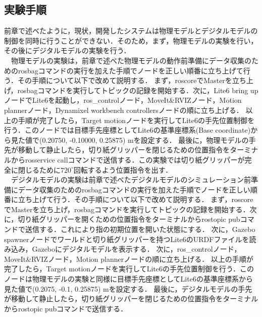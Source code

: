\subsection{実験手順}
前章で述べたように，現状，開発したシステムは物理モデルとデジタルモデルの制御を同時に行うことができない．そのため，まず，物理モデルの実験を行い，その後にデジタルモデルの実験を行う．\\
　物理モデルの実験は，前章で述べた物理モデルの動作前準備にデータ収集のためのrosbagコマンドの実行を加えた手順でノードを正しい順番に立ち上げて行う．その手順について以下で改めて説明する．
まず，roscoreでMasterを立ち上げ，rosbagコマンドを実行してトピックの記録を開始する．次に，Lite6 bring upノードでLite6を起動し，ros\_controlノード，MoveIt\&RVIZノード，Motion plannerノード，Dynamixel workbench controllersノードの順に立ち上げる．
以上の手順が完了したら，Target motionノードを実行してLite6の手先位置制御を行う．このノードでは目標手先座標としてLite6の基準座標系(Base coordinate)から見た値で(0.20750, -0.10000, 0.25875) mを設定する．
最後に，物理モデルの手先が移動して静止したら，切り紙グリッパーを閉じるための位置指令をターミナルからrosservice callコマンドで送信する．この実験では切り紙グリッパーが完全に閉じるために$720^\circ$回転するよう位置指令を出す．\\
　デジタルモデルの実験は前章で述べたデジタルモデルのシミュレーション前準備にデータ収集のためのrosbagコマンドの実行を加えた手順でノードを正しい順番に立ち上げて行う．その手順について以下で改めて説明する．
まず，roscoreでMasterを立ち上げ，rosbagコマンドを実行してトピックの記録を開始する．次に，切り紙グリッパーを開くための位置指令をターミナルからrostopic pubコマンドで送信する．これにより指の初期位置を開いた状態にする．
次に，Gazebo spawnerノードでワールドと切り紙グリッパーを持つLite6のURDFファイルを読み込み，Gazeboにデジタルモデルを表示する．
次に，ros\_controlノード，MoveIt\&RVIZノード，Motion plannerノードの順に立ち上げる．
以上の手順が完了したら，Target motionノードを実行してLite6の手先位置制御を行う．このノードは物理モデルの実験と同様に目標手先座標としてLite6の基準座標系から見た値で(0.2075, -0.1, 0.25875) mを設定する．
最後に，デジタルモデルの手先が移動して静止したら，切り紙グリッパーを閉じるための位置指令をターミナルからrostopic pubコマンドで送信する．




